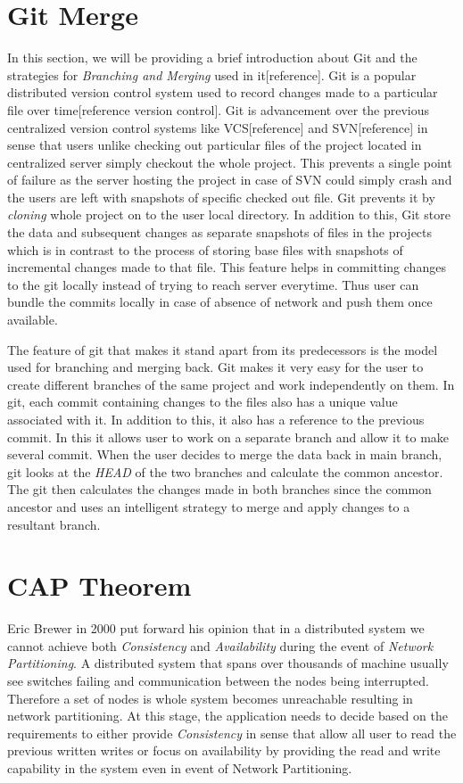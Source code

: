 \documentclass[12pt,a4paper,twoside,openright]{book}
\begin{document}
\section{Git Merge}
In this section, we will be providing a brief introduction about Git and the strategies for \textit{Branching and Merging} used in it[reference]. Git is a popular distributed version control system used to record changes made to a particular file over time[reference version control]. Git is advancement over the previous centralized version control systems like VCS[reference] and SVN[reference] in sense that users unlike checking out particular files of the project located in centralized server simply checkout the whole project. This prevents a single point of failure as the server hosting the project in case of SVN could simply crash and the users are left with snapshots of specific checked out file. Git prevents it by \textit{cloning} whole project on to the user local directory. In addition to this, Git store the data and subsequent changes as separate snapshots of files in the projects which is in contrast to the process of storing base files with snapshots of incremental changes made to that file. This feature helps in committing changes to the git locally instead of trying to reach server everytime. Thus user can bundle the commits locally in case of absence of network and push them once available.
\par The feature of git that makes it stand apart from its predecessors is the model used for branching and merging back. Git makes it very easy for the user to create different branches of the same project and work independently on them. In git, each commit containing changes to the files also has a unique value associated with it. In addition to this, it also has a reference to the previous commit. In this it allows user to work on a separate branch and allow it to make several commit. When the user decides to merge the data back in main branch, git looks at the \textit{HEAD} of the two branches and calculate the common ancestor. The git then calculates the changes made in both branches since the common ancestor and uses an intelligent strategy to merge and apply changes to a resultant branch. 


\section{CAP Theorem}
Eric Brewer in 2000 put forward his opinion that in a distributed system we cannot achieve both \textit{Consistency} and \textit{Availability} during the event of \textit{Network Partitioning}. A distributed system that spans over thousands of machine usually see switches failing and communication between the nodes being interrupted. Therefore a set of nodes is whole system becomes unreachable resulting in network partitioning. At this stage, the application needs to decide based on the requirements to either provide \textit{Consistency} in sense that allow all user to read the previous written writes or focus on availability by providing the read and write capability in the system even in event of Network Partitioning.
\end{document}
